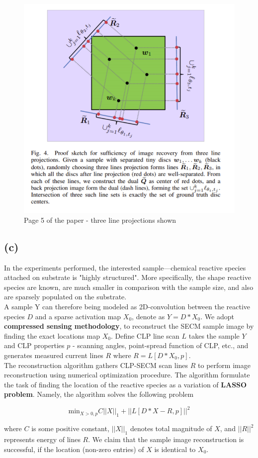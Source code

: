 \documentclass[fleqn, 11pt]{article}
\begin{document}
\begin{figure}[H]
   \includegraphics[scale=0.4]{Q6_Pg5.png}
   \caption{Page 5 of the paper - three line projections shown}
\end{figure}

\subsection*{(c)}
In the experiments performed, the interested sample---chemical reactive species attached on substrate is "highly structured". More specifically, the shape reactive species are known, are much smaller in comparison with the sample size, and also are sparsely populated on the substrate. \\
A sample Y can therefore being modeled as 2D-convolution between the reactive species $D$ and a sparse activation map $X_0$, denote as $Y = D * X_0$. We adopt \textbf{compressed sensing methodology}, to reconstruct the SECM sample image by finding the exact locations map $X_0$. Define CLP line scan $L$ takes the sample $Y$ and CLP properties $p$ -  scanning angles, point-spread function of CLP, etc., and generates measured current lines $R$ where $R = L[ D * X_0, p]$. \\

The reconstruction algorithm gathers CLP-SECM scan lines $R$ to perform image reconstruction using numerical optimization procedure. The algorithm formulate the task of finding the location of the reactive species as a variation of \textbf{LASSO problem}. Namely, the algorithm solves the following problem

$$\text{min}_{X>0, p} C||X||_1 + ||L[D*X-R, p]||^2$$

where $C$ is some positive constant, $||X||_1$ denotes total magnitude of $X$, and $||R||^2$ represents energy of lines $R$. We claim that the sample image reconstruction is successful, if the location (non-zero entries) of $X$ is identical to $X_0$.
\end{document}
